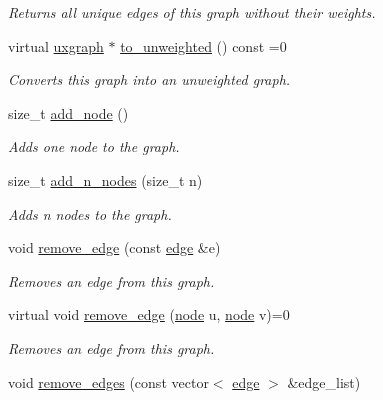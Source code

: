 \begin{DoxyCompactItemize}
\begin{DoxyCompactList}\small\item\em Returns all unique edges of this graph without their weights. \end{DoxyCompactList}\item 
virtual \hyperlink{classlgraph_1_1utils_1_1uxgraph}{uxgraph} $\ast$ \hyperlink{classlgraph_1_1utils_1_1wxgraph_a66d7a1fb48324c361d59dfa2d13db9eb}{to\-\_\-unweighted} () const =0
\begin{DoxyCompactList}\small\item\em Converts this graph into an unweighted graph. \end{DoxyCompactList}\item 
size\-\_\-t \hyperlink{classlgraph_1_1utils_1_1xxgraph_af41baf2c098e872731ad646aeec1b382}{add\-\_\-node} ()
\begin{DoxyCompactList}\small\item\em Adds one node to the graph. \end{DoxyCompactList}\item 
size\-\_\-t \hyperlink{classlgraph_1_1utils_1_1xxgraph_ae1283d13858ea06a6999626a01d12e4b}{add\-\_\-n\-\_\-nodes} (size\-\_\-t n)
\begin{DoxyCompactList}\small\item\em Adds {\itshape n} nodes to the graph. \end{DoxyCompactList}\item 
void \hyperlink{classlgraph_1_1utils_1_1xxgraph_af826c05492f237d7727f88ebab033001}{remove\-\_\-edge} (const \hyperlink{namespacelgraph_1_1utils_a6510284ce1b1ae5dc97ce5d2de426e10}{edge} \&e)
\begin{DoxyCompactList}\small\item\em Removes an edge from this graph. \end{DoxyCompactList}\item 
virtual void \hyperlink{classlgraph_1_1utils_1_1xxgraph_a722693838fb7cfbd5b78c293fffc2413}{remove\-\_\-edge} (\hyperlink{namespacelgraph_1_1utils_a7bd66ede3805ef121bc2835bd48de0cf}{node} u, \hyperlink{namespacelgraph_1_1utils_a7bd66ede3805ef121bc2835bd48de0cf}{node} v)=0
\begin{DoxyCompactList}\small\item\em Removes an edge from this graph. \end{DoxyCompactList}\item 
void \hyperlink{classlgraph_1_1utils_1_1xxgraph_a747da8a567d232081199499f23821926}{remove\-\_\-edges} (const vector$<$ \hyperlink{namespacelgraph_1_1utils_a6510284ce1b1ae5dc97ce5d2de426e10}{edge} $>$ \&edge\-\_\-list)

\end{DoxyCompactItemize}
